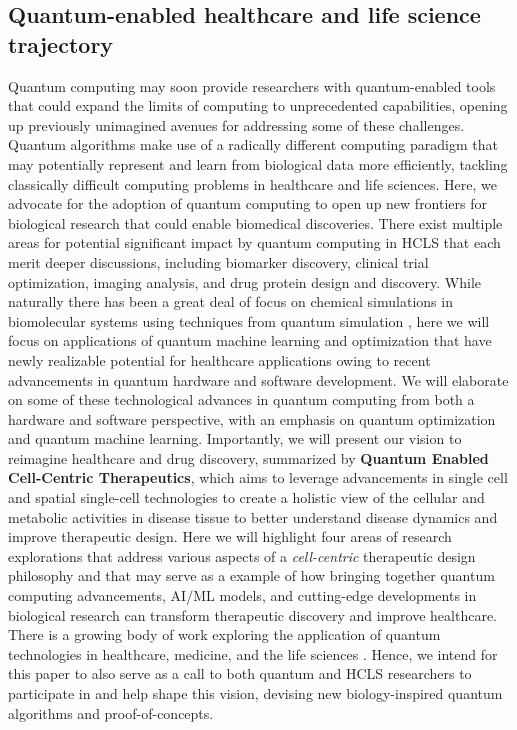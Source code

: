 \documentclass{article}
\begin{document}
\subsection*{Quantum-enabled healthcare and life science trajectory}
Quantum computing may soon provide researchers with quantum-enabled tools that could expand the limits of computing to unprecedented capabilities, opening up previously unimagined avenues for addressing some of these challenges. Quantum algorithms make use of a radically different computing paradigm that may potentially represent and learn from biological data more efficiently, tackling classically difficult computing problems in healthcare and life sciences. Here, we advocate for the adoption of quantum computing to open up new frontiers for biological research that could enable biomedical discoveries. 
There exist multiple areas for potential significant impact by quantum computing in HCLS that each merit deeper discussions, including biomarker discovery, clinical trial optimization, imaging analysis, and drug protein design and discovery. While naturally there has been a great deal of focus on chemical simulations in biomolecular systems using techniques from quantum simulation \cite{daley2022practical, tacchino2020quantum, altman2021quantum}, here we will focus on applications of quantum machine learning and optimization that have newly realizable potential for healthcare applications owing to recent advancements in quantum hardware and software development. We will elaborate on some of these technological advances in quantum computing from both a hardware and software perspective, with an emphasis on quantum optimization and quantum machine learning.
Importantly, we will present our vision to reimagine healthcare and drug discovery, summarized by \textbf{Quantum Enabled Cell-Centric Therapeutics}, which aims to leverage advancements in single cell and spatial single-cell technologies to create a holistic view of the cellular and metabolic activities in disease tissue to better understand disease dynamics and improve therapeutic design. Here we will highlight four areas of research explorations that address various aspects of a \textit{cell-centric} therapeutic design philosophy and that may serve as a example of how bringing together quantum computing advancements, AI/ML models, and cutting-edge developments in biological research can transform therapeutic discovery and improve healthcare. There is a growing body of work exploring the application of quantum technologies in healthcare, medicine, and the life sciences \cite{floether_griffin_2023}. Hence, we intend for this paper to also serve as a call to both quantum and HCLS researchers to participate in and help shape this vision, devising new biology-inspired quantum algorithms and proof-of-concepts.
\end{document}
